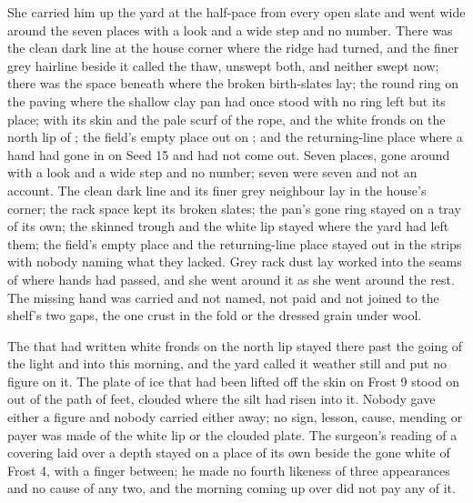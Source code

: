 She carried him up the yard at the half-pace from every open slate and went wide around the seven places with a look and a wide step and no number. There was the clean dark line at the house corner where the ridge had turned, and the finer grey hairline beside it called the thaw, unswept both, and neither swept now; there was the space beneath  where the broken birth-slates lay; the round ring on the paving where the shallow clay pan had once stood with no ring left but its place;  with its skin and the pale scurf of the rope, and the white fronds on the north lip of ; the field’s empty place out on ; and the returning-line place where a hand had gone in on Seed 15 and had not come out. Seven places, gone around with a look and a wide step and no number; seven were seven and not an account. The clean dark line and its finer grey neighbour lay in the house’s corner; the rack space kept its broken slates; the pan’s gone ring stayed on a tray of its own; the skinned trough and the white lip stayed where the yard had left them; the field’s empty place and the returning-line place stayed out in the strips with nobody naming what they lacked. Grey rack dust lay worked into the seams of  where hands had passed, and she went around it as she went around the rest. The missing hand was carried and not named, not paid and not joined to the shelf’s two gaps, the one crust in the fold or the dressed grain under wool.

The  that had written white fronds on the north lip stayed there past the going of the light and into this morning, and the yard called it weather still and put no figure on it. The plate of ice that had been lifted off the skin on Frost 9 stood on  out of the path of feet, clouded where the silt had risen into it. Nobody gave either a figure and nobody carried either away; no sign, lesson, cause, mending or payer was made of the white lip or the clouded plate. The surgeon’s reading of a covering laid over a depth stayed on a place of its own beside the gone white of Frost 4, with a finger between; he made no fourth likeness of three appearances and no cause of any two, and the morning coming up over  did not pay any of it.

